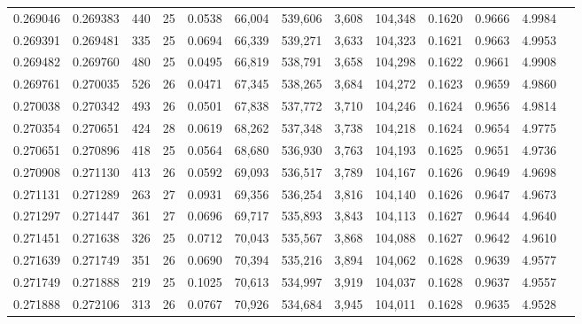 \begin{tabular}{rrrrrrrrrrrrr}
0.269046 & 0.269383 & 440 &  25 &                                     0.0538 &  66,004 & 539,606 &   3,608 & 104,348 & 0.1620 & 0.9666 & 4.9984 \\
0.269391 & 0.269481 & 335 &  25 &                                     0.0694 &  66,339 & 539,271 &   3,633 & 104,323 & 0.1621 & 0.9663 & 4.9953 \\
0.269482 & 0.269760 & 480 &  25 &                                     0.0495 &  66,819 & 538,791 &   3,658 & 104,298 & 0.1622 & 0.9661 & 4.9908 \\
0.269761 & 0.270035 & 526 &  26 &                                     0.0471 &  67,345 & 538,265 &   3,684 & 104,272 & 0.1623 & 0.9659 & 4.9860 \\
0.270038 & 0.270342 & 493 &  26 &                                     0.0501 &  67,838 & 537,772 &   3,710 & 104,246 & 0.1624 & 0.9656 & 4.9814 \\
0.270354 & 0.270651 & 424 &  28 &                                     0.0619 &  68,262 & 537,348 &   3,738 & 104,218 & 0.1624 & 0.9654 & 4.9775 \\
0.270651 & 0.270896 & 418 &  25 &                                     0.0564 &  68,680 & 536,930 &   3,763 & 104,193 & 0.1625 & 0.9651 & 4.9736 \\
0.270908 & 0.271130 & 413 &  26 &                                     0.0592 &  69,093 & 536,517 &   3,789 & 104,167 & 0.1626 & 0.9649 & 4.9698 \\
0.271131 & 0.271289 & 263 &  27 &                                     0.0931 &  69,356 & 536,254 &   3,816 & 104,140 & 0.1626 & 0.9647 & 4.9673 \\
0.271297 & 0.271447 & 361 &  27 &                                     0.0696 &  69,717 & 535,893 &   3,843 & 104,113 & 0.1627 & 0.9644 & 4.9640 \\
0.271451 & 0.271638 & 326 &  25 &                                     0.0712 &  70,043 & 535,567 &   3,868 & 104,088 & 0.1627 & 0.9642 & 4.9610 \\
0.271639 & 0.271749 & 351 &  26 &                                     0.0690 &  70,394 & 535,216 &   3,894 & 104,062 & 0.1628 & 0.9639 & 4.9577 \\
0.271749 & 0.271888 & 219 &  25 &                                     0.1025 &  70,613 & 534,997 &   3,919 & 104,037 & 0.1628 & 0.9637 & 4.9557 \\
0.271888 & 0.272106 & 313 &  26 &                                     0.0767 &  70,926 & 534,684 &   3,945 & 104,011 & 0.1628 & 0.9635 & 4.9528 \\

\end{tabular}
